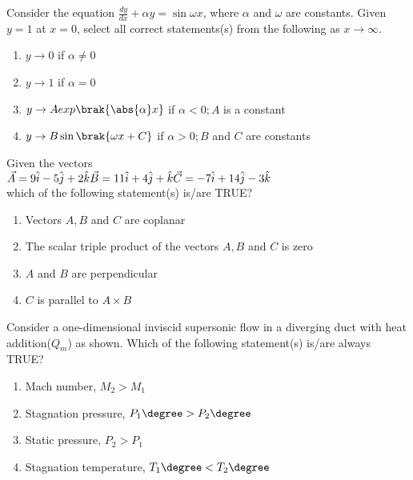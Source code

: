 	\item Consider the equation $\frac{dy}{dx}+\alpha y=\sin \omega x$, where $\alpha$ and $\omega$ are constants. Given $y=1$ at $x=0$, select all correct statements(s) from the following as $x \to \infty$.
		\begin{enumerate}
	\item $y\to 0$ if $\alpha\neq0$
	\item $y\to 1$ if $\alpha =0$
	\item $y\to A exp\brak{\abs{\alpha}x}$ if $\alpha<0;A$ is a constant
	\item $y\to B \sin\brak{\omega x+C}$ if $\alpha>0;B$ and $C$ are constants
		\end{enumerate}


	\item Given the vectors \\ $\vec{A}=9\hat{i}-5\hat{j}+2\hat{k}\\ \vec{B}=11\hat{i}+4\hat{j}+\hat{k}\\ \vec{C}=-7\hat{i}+14\hat{j}-3\hat{k}$\\ which of the following statement(s) is/are TRUE?
		\begin{enumerate}
		\item Vectors $A,B$ and $C$ are coplanar
		\item The scalar triple product of the vectors $A,B$ and $C$ is zero
		\item $A$ and $B$ are perpendicular
		\item $C$ is parallel to $A \times B$
		\end{enumerate}

		
	\item Consider a one-dimensional inviscid supersonic flow in a diverging duct with heat addition($Q_m$) as shown. Which of the following statement(s) is/are always TRUE?\\
		\begin{center}
\end{center}
		\begin{enumerate}
			\item Mach number, $M_2>M_1$
			\item Stagnation pressure, $P_1\degree>P_2\degree$
			\item Static pressure, $P_2>P_1$
			\item Stagnation temperature, $T_1\degree<T_2\degree$
		\end{enumerate}


